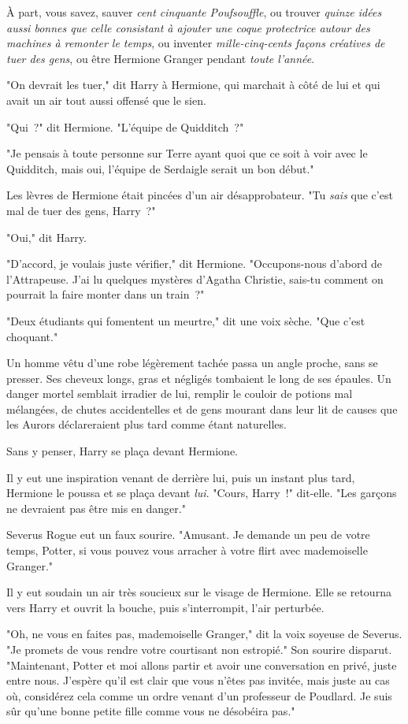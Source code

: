 À part, vous savez, sauver \emph{cent cinquante Poufsouffle}, ou trouver \emph{quinze idées aussi bonnes que celle consistant à ajouter une coque protectrice autour des machines à remonter le temps}, ou inventer \emph{mille-cinq-cents façons créatives de tuer des gens}, ou être Hermione Granger pendant \emph{toute l'année}.

"On devrait les tuer," dit Harry à Hermione, qui marchait à côté de lui et qui avait un air tout aussi offensé que le sien.

"Qui~?" dit Hermione. "L'équipe de Quidditch~?"

"Je pensais à toute personne sur Terre ayant quoi que ce soit à voir avec le Quidditch, mais oui, l'équipe de Serdaigle serait un bon début."

Les lèvres de Hermione était pincées d'un air désapprobateur. "Tu \emph{sais} que c'est mal de tuer des gens, Harry~?"

"Oui," dit Harry.

"D'accord, je voulais juste vérifier," dit Hermione. "Occupons-nous d'abord de l'Attrapeuse. J'ai lu quelques mystères d'Agatha Christie, sais-tu comment on pourrait la faire monter dans un train~?"

"Deux étudiants qui fomentent un meurtre," dit une voix sèche. "Que c'est choquant."

Un homme vêtu d’une robe légèrement tachée passa un angle proche, sans se presser. Ses cheveux longs, gras et négligés tombaient le long de ses épaules. Un danger mortel semblait irradier de lui, remplir le couloir de potions mal mélangées, de chutes accidentelles et de gens mourant dans leur lit de causes que les Aurors déclareraient plus tard comme étant naturelles.

Sans y penser, Harry se plaça devant Hermione.

Il y eut une inspiration venant de derrière lui, puis un instant plus tard, Hermione le poussa et se plaça devant \emph{lui}. "Cours, Harry~!" dit-elle. "Les garçons ne devraient pas être mis en danger."

Severus Rogue eut un faux sourire. "Amusant. Je demande un peu de votre temps, Potter, si vous pouvez vous arracher à votre flirt avec mademoiselle Granger."

Il y eut soudain un air très soucieux sur le visage de Hermione. Elle se retourna vers Harry et ouvrit la bouche, puis s'interrompit, l'air perturbée.

"Oh, ne vous en faites pas, mademoiselle Granger," dit la voix soyeuse de Severus. "Je promets de vous rendre votre courtisant non estropié." Son sourire disparut. "Maintenant, Potter et moi allons partir et avoir une conversation en privé, juste entre nous. J'espère qu'il est clair que vous n'êtes pas invitée, mais juste au cas où, considérez cela comme un ordre venant d'un professeur de Poudlard. Je suis sûr qu'une bonne petite fille comme vous ne désobéira pas."

